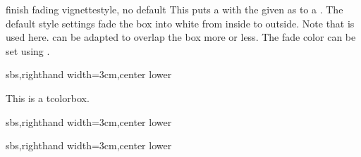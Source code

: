 \clearpage
\begin{docTcbKey}[][doc new=2016-04-22]{finish fading vignette}{}{style, no default}
  This puts a  with the given 
  as  to a .
  The default style settings fade the box into white from inside to outside.
  Note that  is used here.
   can be adapted to overlap the box
  more or less. The fade color can be set using
  .

\begin{dispExample*}{sbs,righthand width=3cm,center lower}
\begin{tcolorbox}[enhanced,size=small,
  colback=green!10,colframe=green!50!black,
  boxrule=0.5mm,titlerule=0mm,
  title=My title,center title,fonttitle=\bfseries,
  finish fading vignette={size=2mm}]
    This is a tcolorbox.
\end{tcolorbox}
\end{dispExample*}

\begin{dispExample*}{sbs,righthand width=3cm,center lower}
\end{dispExample*}

\begin{dispExample*}{sbs,righthand width=3cm,center lower}
\begin{tcolorbox}[colback=blue!50!black,size=small,
  title=Example]
\end{tcolorbox}
\end{dispExample*}

\end{docTcbKey}



